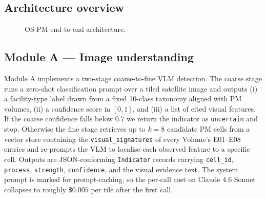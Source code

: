 \documentclass[11pt,a4paper]{article}
\begin{document}
\subsection{Architecture overview}
\begin{figure}[h]
  \centering
  \caption{OS-PM end-to-end architecture.}
  \label{fig:arch}
\end{figure}

\subsection{Module A --- Image understanding}

Module A implements a two-stage coarse-to-fine VLM detection. The
coarse stage runs a zero-shot classification prompt over a tiled
satellite image and outputs (i) a facility-type label drawn from a
fixed 10-class taxonomy aligned with PM volumes, (ii) a confidence
score in $[0,1]$, and (iii) a list of cited visual features. If the
coarse confidence falls below $0.7$ we return the indicator as
\texttt{uncertain} and stop. Otherwise the fine stage retrieves up to
$k=8$ candidate PM cells from a vector store containing the
\texttt{visual\_signatures} of every Volume's E01--E08 entries and
re-prompts the VLM to localise each observed feature to a specific
cell. Outputs are JSON-conforming \texttt{Indicator} records carrying
\texttt{cell\_id}, \texttt{process}, \texttt{strength},
\texttt{confidence}, and the visual evidence text. The system prompt
is marked for prompt-caching, so the per-call cost on Claude 4.6
Sonnet collapses to roughly $\$0.005$ per tile after the first call.
\end{document}
